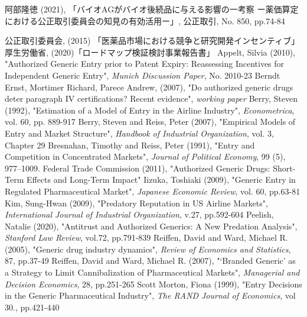 \documentclass[a4j,10.5pt]{jarticle}
\begin{document}
\newpage

\begin{thebibliography}{3}
阿部隆徳 (2021), 「バイオAGがバイオ後続品に与える影響の一考察 ー薬価算定における公正取引委員会の知見の有効活用ー」, 公正取引, No. 850, pp.74-84

公正取引委員会, (2015) 「医薬品市場における競争と研究開発インセンティブ」
厚生労働省, (2020)「ロードマップ検証検討事業報告書」
Appelt, Silvia (2010), "Authorized Generic Entry prior to Patent Expiry: Reassessing Incentives for Independent Generic Entry", {\it Munich Discussion Paper}, No. 2010-23
Berndt Ernst, Mortimer Richard, Parece Andrew, (2007), "Do authorized generic drugs deter paragraph IV certifications? Recent evidence", {\it working paper}
Berry, Steven (1992), "Estimation of a Model of Entry in the Airline Industry", {\it Econometrica}, vol. 60, pp. 889-917
Berry, Steven and Reiss, Peter (2007), "Empirical Models of Entry and Market Structure", {\it Handbook of Industrial Organization}, vol. 3, Chapter 29
Bresnahan, Timothy and Reiss, Peter (1991), "Entry and Competition in Concentrated Markets", {\it Journal of Political Economy}, 99 (5), 977–1009.
Federal Trade Commission (2011), "Authorized Generic Drugs: Short-Term Effects and Long-Term Impact"
Iizuka, Toshiaki (2009), "Generic Entry in Regulated Pharmaceutical Market", {\it Japanese Economic Review}, vol. 60, pp.63-81
Kim, Sung-Hwan (2009), "Predatory Reputation in US Airline Markets", {\it International Journal of Industrial Organization}, v.27, pp.592-604
Peelish, Natalie (2020), "Antitrust and Authorized Generics: A New Predation Analysis", {\it Stanford Law Review}, vol.72, pp.791-839
Reiffen, David and Ward, Michael R. (2005), "Generic drug industry dynamics", {\it Review of Economics and Statistics}, 87, pp.37-49
Reiffen, David and Ward, Michael R. (2007), "‘Branded Generic’ as a Strategy to Limit Cannibalization of Pharmaceutical Markets", {\it Managerial and Decision Economics}, 28, pp.251-265
Scott Morton, Fiona (1999), "Entry Decisions in the Generic Pharmaceutical Industry", {\it The RAND Journal of Economics}, vol 30., pp.421-440

\end{thebibliography}

\newpage
\end{document}
